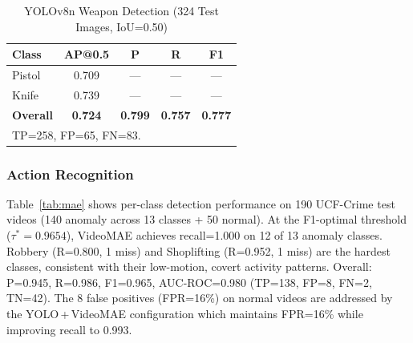 \documentclass[conference]{IEEEtran}
\begin{document}
\begin{table}[h]
\caption{YOLOv8n Weapon Detection (324 Test Images, IoU=0.50)}
\label{tab:yolo}
\centering
\begin{tabular}{lcccc}
\toprule
\textbf{Class} & \textbf{AP@0.5} & \textbf{P} & \textbf{R} & \textbf{F1}\\
\midrule
Pistol   & 0.709 & --- & --- & ---\\
Knife    & 0.739 & --- & --- & ---\\
\midrule
\textbf{Overall} & \textbf{0.724} & \textbf{0.799} & \textbf{0.757}
                 & \textbf{0.777}\\
\bottomrule
\multicolumn{5}{l}{\footnotesize TP=258, FP=65, FN=83.}
\end{tabular}
\end{table}

\subsubsection{Action Recognition}
Table~\ref{tab:mae} shows per-class detection performance on 190 UCF-Crime
test videos (140 anomaly across 13 classes + 50 normal).
At the F1-optimal threshold ($\tau^*=0.9654$), VideoMAE achieves
recall=1.000 on 12 of 13 anomaly classes.
Robbery (R=0.800, 1 miss) and Shoplifting (R=0.952, 1 miss) are the
hardest classes, consistent with their low-motion, covert activity patterns.
Overall: P=0.945, R=0.986, F1=0.965, AUC-ROC=0.980 (TP=138, FP=8, FN=2, TN=42).
The 8 false positives (FPR=16\%) on normal videos are addressed by the
YOLO\,+\,VideoMAE configuration which maintains FPR=16\% while
improving recall to 0.993.
\end{document}
